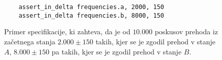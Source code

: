 \begin{figure}
\begin{verbatim}
    assert_in_delta frequencies.a, 2000, 150
    assert_in_delta frequencies.b, 8000, 150
\end{verbatim}
\caption{%
Primer specifikacije, ki zahteva, da je od $10.000$ poskusov prehoda iz začetnega stanja $2.000\pm150$ takih, kjer se je zgodil prehod v stanje $A$, $8.000\pm150$ pa takih, kjer se je zgodil prehod v stanje $B$.}
\label{fig:impl:assert_ergodic}
\end{figure}
